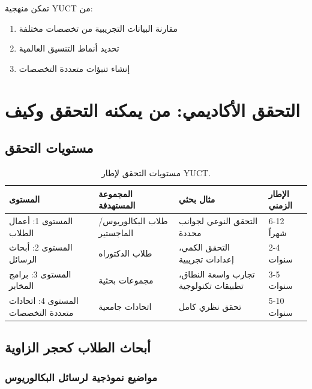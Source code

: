 \documentclass[12pt,a4paper]{article}
\begin{document}
	تمكن منهجية YUCT من:
	\begin{enumerate}
		\item مقارنة البيانات التجريبية من تخصصات مختلفة
		\item تحديد أنماط التنسيق العالمية
		\item إنشاء تنبؤات متعددة التخصصات
	\end{enumerate}
	
	\section{التحقق الأكاديمي: من يمكنه التحقق وكيف}
	
	\subsection{مستويات التحقق}
	
	\begin{table}[h]
		\centering
		\begin{tabular}{p{}p{}p{}p{}}
			\toprule
			\textbf{المستوى} & \textbf{المجموعة المستهدفة} & \textbf{مثال بحثي} & \textbf{الإطار الزمني} \\
			\midrule
			المستوى 1: أعمال الطلاب & طلاب البكالوريوس/الماجستير & التحقق النوعي لجوانب محددة & 6-12 شهراً \\
			المستوى 2: أبحاث الرسائل & طلاب الدكتوراه & التحقق الكمي، إعدادات تجريبية & 2-4 سنوات \\
			المستوى 3: برامج المخابر & مجموعات بحثية & تجارب واسعة النطاق، تطبيقات تكنولوجية & 3-5 سنوات \\
			المستوى 4: اتحادات متعددة التخصصات & اتحادات جامعية & تحقق نظري كامل & 5-10 سنوات \\
			\bottomrule
		\end{tabular}
		\caption{مستويات التحقق لإطار YUCT.}
		\label{tab:verification-levels}
	\end{table}
	
	\subsection{أبحاث الطلاب كحجر الزاوية}
	
	\subsubsection{مواضيع نموذجية لرسائل البكالوريوس}
	
\end{document}
